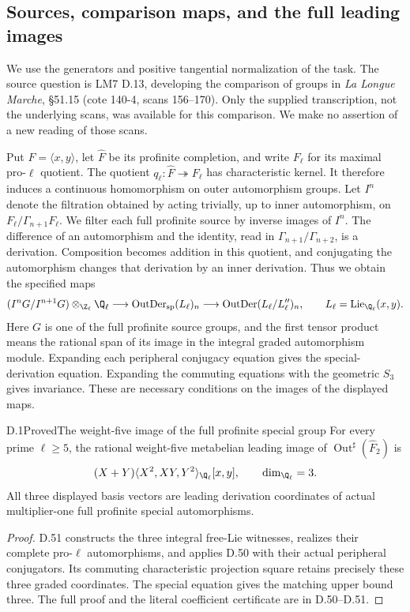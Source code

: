 \subsection{Sources, comparison maps, and the full leading images}

We use the generators and positive tangential normalization of the task.
The source question is LM7 D.13, developing the comparison of groups in
\emph{La Longue Marche}, \S51.15 (cote 140-4, scans 156--170).
Only the supplied transcription, not the underlying scans, was available
for this comparison. We make no assertion of a new reading of those scans.

Put $F=\langle x,y\rangle$, let $\widehat F$ be its profinite completion,
and write $F_\ell$ for its maximal pro-$\ell$ quotient. The quotient
$q_\ell:\widehat F\twoheadrightarrow F_\ell$ has characteristic kernel.
It therefore induces a continuous homomorphism on outer automorphism
groups. Let $I^n$ denote the filtration obtained by acting trivially,
up to inner automorphism, on $F_\ell/\Gamma_{n+1}F_\ell$.
We filter each full profinite source by inverse images of $I^n$.
The difference of an automorphism and the identity, read in
$\Gamma_{n+1}/\Gamma_{n+2}$, is a derivation. Composition becomes addition
in this quotient, and conjugating the automorphism changes that
derivation by an inner derivation. Thus we obtain the specified maps
\[
 (I^nG/I^{n+1}G)\otimes_{\Z_\ell}\Q_\ell
 \longrightarrow \operatorname{OutDer}_{\mathrm{sp}}(L_\ell)_n
 \longrightarrow \operatorname{OutDer}(L_\ell/L_\ell'')_n,
 \qquad L_\ell=\operatorname{Lie}_{\Q_\ell}(x,y).
\]
Here $G$ is one of the full profinite source groups, and the first
tensor product means the rational span of its image in the integral
graded automorphism module. Expanding each peripheral conjugacy equation
gives the special-derivation equation. Expanding the commuting equations
with the geometric $S_3$ gives invariance. These are necessary conditions
on the images of the displayed maps.

\begin{statement}{D.1}{Proved}{The weight-five image of the full profinite special group}
For every prime $\ell\geq5$, the rational weight-five metabelian
leading image of $\operatorname{Out}^{\sharp}(\widehat F_2)$ is
\[
 (X+Y)\langle X^2,XY,Y^2\rangle_{\Q_\ell}[x,y],
 \qquad\dim_{\Q_\ell}=3.
\]
All three displayed basis vectors are leading derivation coordinates
of actual multiplier-one full profinite special automorphisms.
\end{statement}
\begin{proof}
D.51 constructs the three integral free-Lie witnesses, realizes their
complete pro-$\ell$ automorphisms, and applies D.50 with their actual
peripheral conjugators. Its commuting characteristic projection square
retains precisely these three graded coordinates. The special equation
gives the matching upper bound three. The full proof and the literal
coefficient certificate are in D.50--D.51.
\end{proof}

